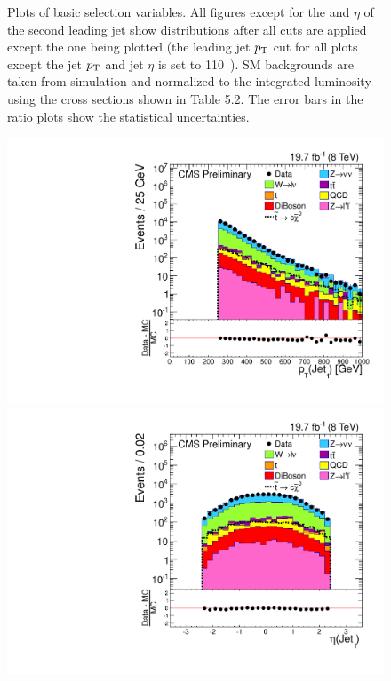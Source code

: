 \begin{figure}
\begin{center}
  \caption{Plots of basic selection variables.  All figures except for the \pt{} and $\eta$ of the second leading jet 
show distributions after all cuts are applied except the one being plotted (the leading jet $p_{\text{T}}$ cut for all plots except the jet $p_{\text{T}}$ and jet $\eta$ is set to 110~\GeV{}). \ac{SM} backgrounds are taken from simulation and normalized to the integrated luminosity using the cross sections shown in Table 5.2. 
The error bars in the ratio plots show the statistical uncertainties.
  \label{fig:n-1plots}}
  \end{center}
\end{figure}

\begin{figure}%
  \begin{center}
  \includegraphics[scale=0.32]     {Figures/sus13009/cut/Jet1Pt.pdf}
  \includegraphics[scale=0.32]     {Figures/sus13009/cut/Jet1Eta.pdf}

\end{center}
\end{figure}
